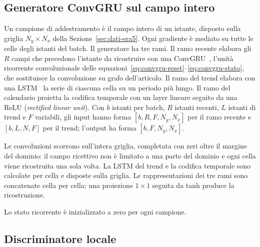 \subsection{Generatore ConvGRU sul campo intero}
\label{sec:stgan-convgru}
\label{sec:convgru-campo-intero}

Un campione di addestramento è il campo intero di un istante, disposto sulla griglia $N_y\times N_x$ della Sezione~\ref{sec:dati-era5}. Ogni gradiente è mediato su tutte le celle degli istanti del batch. Il generatore ha tre rami. Il ramo recente elabora gli $R$ campi che precedono l'istante da ricostruire con una ConvGRU~\cite{shi2015convlstm,ballas2016convgru}, l'unità ricorrente convoluzionale delle equazioni~\eqref{eq:convgru-reset}--\eqref{eq:convgru-stato}, che sostituisce la convoluzione su grafo dell'articolo. Il ramo del trend elabora con una LSTM~\cite{hochreiter1997lstm} la serie di ciascuna cella su un periodo più lungo. Il ramo del calendario proietta la codifica temporale con un layer lineare seguito da una ReLU (\emph{rectified linear unit}). Con $b$ istanti per batch, $R$ istanti recenti, $L$ istanti di trend e $F$ variabili, gli input hanno forma $[b,R,F,N_y,N_x]$ per il ramo recente e $[b,L,N,F]$ per il trend; l'output ha forma $[b,F,N_y,N_x]$.

Le convoluzioni scorrono sull'intera griglia, completata con zeri oltre il margine del dominio: il campo ricettivo non è limitato a una parte del dominio e ogni cella viene ricostruita una sola volta. La LSTM del trend e la codifica temporale sono calcolate per cella e disposte sulla griglia. Le rappresentazioni dei tre rami sono concatenate cella per cella; una proiezione $1\times1$ seguita da tanh produce la ricostruzione.

Lo stato ricorrente è inizializzato a zero per ogni campione.

\subsection{Discriminatore locale}
\label{sec:stgan-discriminatore}

